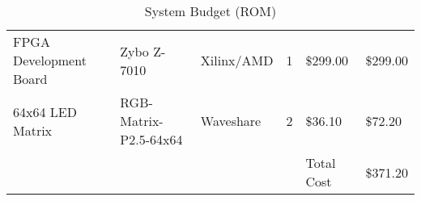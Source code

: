 \begin{table}[H]
	\begin{tabularx}{\textwidth}{| x | a | a | a | a | a |}
		\hline
		         &           &    &  &  &  \\
		\hline
		FPGA Development Board & Zybo Z-7010           & Xilinx/AMD & 1        & \$299.00        & \$299.00            \\
		\hline
		64x64 LED Matrix       & RGB-Matrix-P2.5-64x64 & Waveshare  & 2        & \$36.10         & \$72.20             \\
		\hline
		                       &                       &            &          & Total Cost      & \$371.20            \\
		\hline
	\end{tabularx}
	\caption{System Budget (ROM)}
\end{table}

